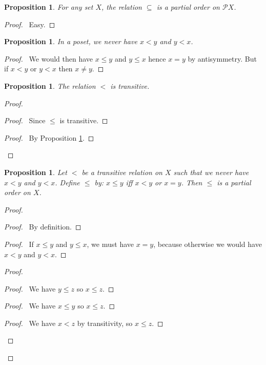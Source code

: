 \documentclass{report}
\let\qed\relax
\newtheorem{prop}[ax]{Proposition}
\theoremstyle{definition}
\begin{document}
\begin{prop}
For any set $X$, the relation $\subseteq$ is a partial order on $\mathcal{P} X$.
\end{prop}

\begin{proof}
\pf\ Easy. \qed
\end{proof}

\begin{prop}
\label{prop:lt_asym}
In a poset, we never have $x < y$ and $y < x$.
\end{prop}

\begin{proof}
\pf\ We would then have $x \leq y$ and $y \leq x$ hence $x = y$ by antisymmetry. But if $x < y$ or $y < x$ then $x \neq y$. \qed
\end{proof}

\begin{prop}
The relation $<$ is transitive.
\end{prop}

\begin{proof}
\pf
{}
\begin{proof}
	\pf\ Since $\leq$ is transitive.
\end{proof}
\begin{proof}
	\pf\ By Proposition \ref{prop:lt_asym}.
\end{proof}
\qed
\end{proof}

\begin{prop}
Let $<$ be a transitive relation on $X$ such that we never have $x < y$ and $y < x$. Define $\leq$ by: $x \leq y$ iff $x < y$ or $x = y$. Then $\leq$ is a partial order on $X$.
\end{prop}

\begin{proof}
\pf
{}
\begin{proof}
	\pf\ By definition.
\end{proof}
\begin{proof}
	\pf\ If $x \leq y$ and $y \leq x$, we must have $x = y$, because otherwise we would have $x < y$ and $y < x$.
\end{proof}
\begin{proof}
	\begin{proof}
		\pf\ We have $y \leq z$ so $x \leq z$.
	\end{proof}
	\begin{proof}
		\pf\ We have $x \leq y$ so $x \leq z$.
	\end{proof}
	\begin{proof}
		\pf\ We have $x < z$ by transitivity, so $x \leq z$.
	\end{proof}
\end{proof}
\qed
\end{proof}
\end{document}
